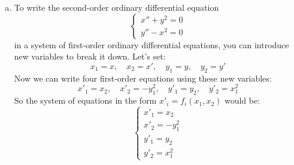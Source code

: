 \documentclass[12pt]{exam}
\begin{document}
\begin{enumerate}[(a)]
	
     \item To write the second-order ordinary differential equation
	  \[\begin{cases}
		  x'' + y^2 = 0 \\
		  y'' - x^2 = 0
	  \end{cases}\]
	in a system of first-order ordinary differential equations, you can introduce new variables to break it down. Let's set:
	\[x_1 = x ,\quad x_2 = x' ,\quad y_1 = y ,\quad y_2 = y'\]
	Now we can write four first-order equations using these new variables:
	\[x'_1 = x_2 ,\quad x'_2 = -y_1^2 ,\quad y'_1 = y_2 ,\quad y'_2 = x_1^2\]
	So the system of equations in the form \(x'_i = f_i(x_1, x_2)\) would be:
	\[\begin{cases}
		x'_1 = x_2 \\
		x'_2 = -y_1^2 \\
		y'_1 = y_2 \\
		y'_2 = x_1^2
	\end{cases}\]
\end{enumerate}

\newpage
\end{document}
